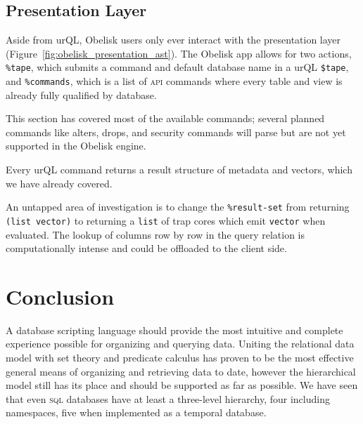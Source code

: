 \documentclass[twoside]{article}
\begin{document}
\subsection{Presentation Layer}

Aside from urQL, Obelisk users only ever interact with the presentation layer (Figure~\ref{fig:obelisk_presentation_ast}). The Obelisk app allows for two actions, \lstinline[style=inlinecode]{%tape}, which submits a command and default database name in a urQL \lstinline[style=inlinecode]{$tape}, and \lstinline[style=inlinecode]{%commands}, which is a list of \textsc{api} commands where every table and view is already fully qualified by database.

This section has covered most of the available commands; several planned commands like alters, drops, and security commands will parse but are not yet supported in the Obelisk engine.

Every urQL command returns a result structure of metadata and vectors, which we have already covered.

An untapped area of investigation is to change the \lstinline[style=inlinecode]{%result-set} from returning \lstinline[style=inlinecode]{(list vector)} to returning a \lstinline[style=inlinecode]{list} of trap cores which emit \lstinline[style=inlinecode]{vector} when evaluated. The lookup of columns row by row in the query relation is computationally intense and could be offloaded to the client side.

\section{Conclusion}

A database scripting language should provide the most intuitive and complete experience possible for organizing and querying data. Uniting the relational data model with set theory and predicate calculus has proven to be the most effective general means of organizing and retrieving data to date, however the hierarchical model still has its place and should be supported as far as possible. We have seen that even \textsc{sql} databases have at least a three-level hierarchy, four including namespaces, five when implemented as a temporal database.
\end{document}
